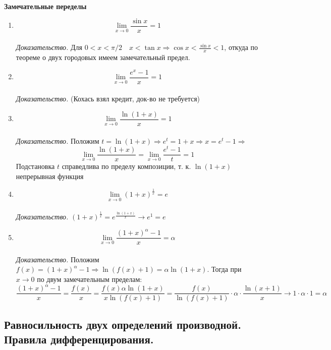 \textbf{Замечательные переделы} \\
\begin{enumerate}
    \item $$\lim_{x \to 0}{\frac{\sin{x}}{x}} = 1$$ \\
    \textit{Доказательство.} Для $0 < x < \pi/2 \quad x < \tan{x} \Rightarrow \cos{x} < \frac{\sin{x}}{x} < 1$, откуда по теореме о двух городовых имеем замечательный предел.
    
    \dotfill
    \item $$\lim_{x \to 0}{\frac{e^x - 1}{x}} = 1$$ \\
    \textit{Доказательство.} (Кохась взял кредит, док-во не требуется)
    
    \dotfill
    \item $$\lim_{x \to 0}{\frac{\ln(1 + x)}{x}} = 1$$ \\
    \textit{Доказательство.} Положим $t = \ln(1 + x) \Rightarrow e^t = 1 + x \Rightarrow x = e^t - 1 \Rightarrow$
    $$ \lim_{x \to 0}{\frac{\ln(1 + x)}{x}} = \lim_{x \to 0}{\frac{e^t - 1}{t}}
    = 1$$
    Подстановка $t$ справедлива по пределу композиции, т. к. $\ln(1 + x)$ непрерывная функция
    
    \dotfill
    \item $$\lim_{x \to 0}{(1 + x) ^ \frac{1}{x}} = e$$ \\
    \textit{Доказательство.} $(1 + x) ^ \frac{1}{x} = e ^ {\frac{\ln(1 + x)}{x}} \rightarrow e^1 = e$
    
    \dotfill
    \item $$\lim_{x \to 0}{\frac{(1 + x)^\alpha - 1}{x}} = \alpha$$ \\
    \textit{Доказательство.} Положим $f(x) = (1 + x)^\alpha - 1 \Rightarrow \ln(f(x)+1) = \alpha\ln(1 + x)$. 
    Тогда при $x\rightarrow 0$ по двум замечательным пределам: $$\frac{(1+x)^\alpha - 1}{x} = \frac{f(x)}{x} = \frac{f(x)\alpha\ln(1 + x)}{x\ln(f(x) + 1)} = \frac{f(x)}{\ln(f(x) + 1)} \cdot \alpha \cdot \frac{\ln(x + 1)}{x} \rightarrow 1 \cdot \alpha \cdot 1 = \alpha$$
\end{enumerate}

\newpage
\subsection{Равносильность двух определений производной. Правила дифференцирования.}

